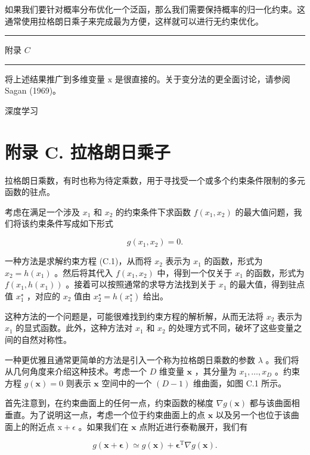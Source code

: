 \documentclass[10pt]{report}
\newcommand{\HRule}{\begin{center}\rule{0.9\linewidth}{0.2mm}\end{center}}
\begin{document}
如果我们要针对概率分布优化一个泛函，那么我们需要保持概率的归一化约束。这通常使用拉格朗日乘子来完成最为方便，这样就可以进行无约束优化。

\HRule

附录 \(C\)

\HRule

将上述结果推广到多维变量 \(\mathrm{x}\) 是很直接的。关于变分法的更全面讨论，请参阅 Sagan (1969)。

深度学习

\section*{附录 C. 拉格朗日乘子}

拉格朗日乘数，有时也称为待定乘数，用于寻找受一个或多个约束条件限制的多元函数的驻点。

考虑在满足一个涉及 \({x}_{1}\) 和 \({x}_{2}\) 的约束条件下求函数 \(f\left( {{x}_{1},{x}_{2}}\right)\) 的最大值问题，我们将该约束条件写成如下形式

\[
g\left( {{x}_{1},{x}_{2}}\right)  = 0. \tag{C.1}
\]

一种方法是求解约束方程 (C.1)，从而将 \({x}_{2}\) 表示为 \({x}_{1}\) 的函数，形式为 \({x}_{2} = h\left( {x}_{1}\right)\) 。然后将其代入 \(f\left( {{x}_{1},{x}_{2}}\right)\) 中，得到一个仅关于 \({x}_{1}\) 的函数，形式为 \(f\left( {{x}_{1},h\left( {x}_{1}\right) }\right)\) 。接着可以按照通常的求导方法找到关于 \({x}_{1}\) 的最大值，得到驻点值 \({x}_{1}^{ \star  }\) ，对应的 \({x}_{2}\) 值由 \({x}_{2}^{ \star  } = h\left( {x}_{1}^{ \star  }\right)\) 给出。

这种方法的一个问题是，可能很难找到约束方程的解析解，从而无法将 \({x}_{2}\) 表示为 \({x}_{1}\) 的显式函数。此外，这种方法对 \({x}_{1}\) 和 \({x}_{2}\) 的处理方式不同，破坏了这些变量之间的自然对称性。

一种更优雅且通常更简单的方法是引入一个称为拉格朗日乘数的参数 \(\lambda\) 。我们将从几何角度来介绍这种技术。考虑一个 \(D\) 维变量 \(\mathbf{x}\) ，其分量为 \({x}_{1},\ldots ,{x}_{D}\) 。约束方程 \(g\left( \mathbf{x}\right)  = 0\) 则表示 \(\mathbf{x}\) 空间中的一个 \(\left( {D - 1}\right)\) 维曲面，如图 C.1 所示。

首先注意到，在约束曲面上的任何一点，约束函数的梯度 \(\nabla g\left( \mathbf{x}\right)\) 都与该曲面相垂直。为了说明这一点，考虑一个位于约束曲面上的点 \(\mathbf{x}\) 以及另一个也位于该曲面上的附近点 \(\mathrm{x} + \epsilon\) 。如果我们在 \(\mathbf{x}\) 点附近进行泰勒展开，我们有

\[
g\left( {\mathbf{x} + \mathbf{\epsilon }}\right)  \simeq  g\left( \mathbf{x}\right)  + {\mathbf{\epsilon }}^{\mathrm{T}}\nabla g\left( \mathbf{x}\right) . \tag{C.2}
\]
\end{document}

